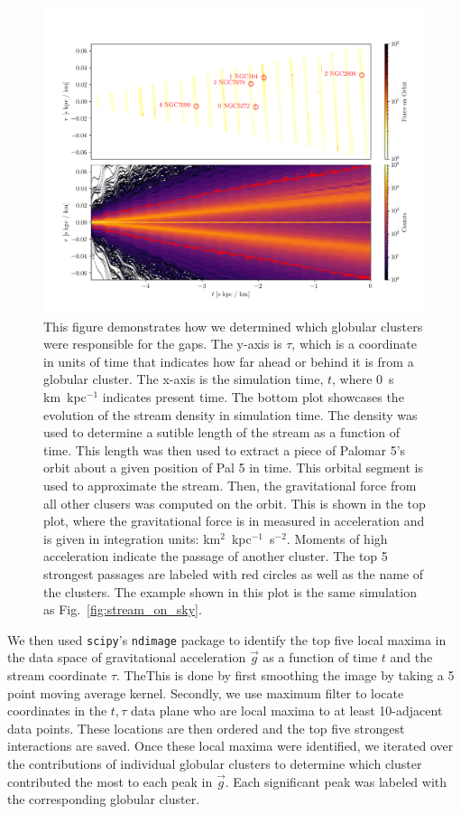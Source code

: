 \documentclass[draft]{aa}
\begin{document}
      \begin{figure}
        \centering
        \includegraphics[width=\linewidth]{force_on_orbit-monte-carlo-009.png}
        \caption{This figure demonstrates how we determined which globular clusters were responsible for the gaps. The y-axis is $\tau$, which is a coordinate in units of time that indicates how far ahead or behind it is from a globular cluster. The x-axis is the simulation time, $t$, where 0~s km~kpc$^{-1}$ indicates present time.  The bottom plot showcases the evolution of the stream density in simulation time. The density was used to determine a sutible length of the stream as a function of time. This length was then used to extract a piece of Palomar 5's orbit about a given position of Pal 5 in time. This orbital segment is used to approximate the stream. Then, the gravitational force from all other clusers was computed on the orbit. This is shown in the top plot, where the gravitational force is in measured in acceleration and is given in integration units: km$^2$~kpc$^{-1}$~s$^{-2}$. Moments of high acceleration indicate the passage of another cluster. The top 5 strongest passages are labeled with red circles as well as the name of the clusters. The example shown in this plot is the same simulation as Fig.~\ref{fig:stream_on_sky}.}
        \label{fig:force-on-orbit}
        \end{figure}  
    

      We then used \texttt{scipy}'s \texttt{ndimage} package to identify the top five local maxima in the data space of gravitational acceleration $\vec{g}$ as a function of time $t$ and the stream coordinate $\tau$. TheThis is done by first smoothing the image by taking a 5 point moving average kernel. Secondly, we use maximum filter to locate coordinates in the $t,\tau$ data plane who are local maxima to at least 10-adjacent data points. These locations are then ordered and the top five strongest interactions are saved. Once these local maxima were identified, we iterated over the contributions of individual globular clusters to determine which cluster contributed the most to each peak in $\vec{g}$. Each significant peak was labeled with the corresponding globular cluster.
\end{document}
